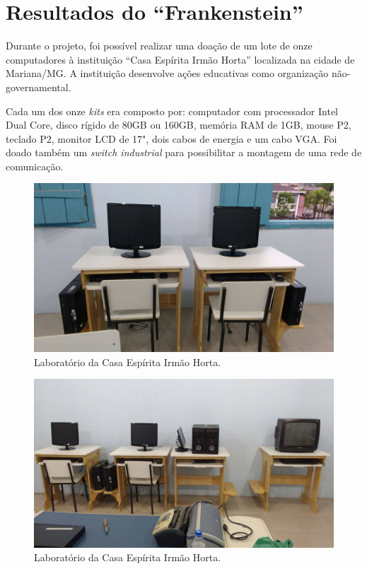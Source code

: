 \documentclass[
	12pt,				%
	openright,			%
	oneside,			%
	a4paper,			%
	english,			%
	spanish,			%
	brazil,				%
	]{abntex2}
\begin{document}
\section{Resultados do ``Frankenstein''}
Durante o projeto, foi possível realizar uma doação de um lote de onze computadores à instituição ``Casa Espírita Irmão Horta'' localizada na cidade de Mariana/MG. A instituição desenvolve ações educativas como organização não-governamental.

Cada um dos onze \textit{kits} era composto por: computador com processador Intel Dual Core, disco rígido de 80GB ou 160GB, memória RAM de 1GB, mouse P2, teclado P2, monitor LCD de 17", dois cabos de energia e um cabo VGA. Foi doado também um \textit{switch industrial} para possibilitar a montagem de uma rede de comunicação. 
\begin{figure}[H]
 		\centering
 		\includegraphics[scale=0.3,angle=0]{figuras/CasaEspirita1.jpg}
 		\caption{Laboratório da Casa Espírita Irmão Horta.}  \label{fig:CasaEspirita1} 
 		\end{figure} 

\begin{figure}[H]
 		\centering
 		\includegraphics[scale=0.3,angle=0]{figuras/CasaEspirita2.jpg}
 		\caption{Laboratório da Casa Espírita Irmão Horta.}  \label{fig:CasaEspirita2} 
 		\end{figure} 
\end{document}
